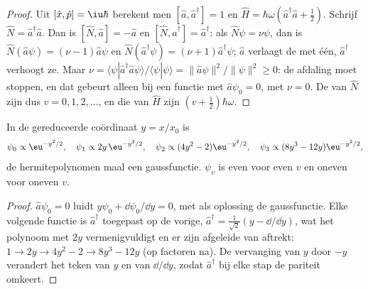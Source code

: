 \begin{proof}
Uit $[\hat x,\hat p] = \iu\hbar$ berekent men $[\hat a,\hat a^\dagger] = 1$ en
$\hat H = \hbar\omega(\hat a^\dagger\hat a + \frac12)$. Schrijf $\hat N =
\hat a^\dagger\hat a$. Dan is $[\hat N,\hat a] = -\hat a$ en $[\hat N,\hat
a^\dagger] = \hat a^\dagger$: als $\hat N\psi = \nu\psi$, dan is $\hat N(\hat
a\psi) = (\nu - 1)\hat a\psi$ en $\hat N(\hat a^\dagger\psi) = (\nu + 1)\hat
a^\dagger\psi$; $\hat a$ verlaagt de  met één, $\hat a^\dagger$
verhoogt ze. Maar $\nu = \langle\psi|\hat a^\dagger\hat a\psi\rangle/\langle\psi|\psi
\rangle = \|\hat a\psi\|^2/\|\psi\|^2 \ge 0$: de afdaling moet stoppen, en dat
gebeurt alleen bij een functie met $\hat a\psi_0 = 0$, met  $\nu = 0$.
De  van $\hat N$ zijn dus $v = 0, 1, 2, \dots$, en die van
$\hat H$ zijn $(v + \frac12)\hbar\omega$.
\end{proof}

\begin{proposition}\label{prop:b3:quantum-model-systems:oscillator-functions}
In de gereduceerde coördinaat $y = x/x_0$ is
\[
\psi_0 \propto \eu^{-y^2/2}, \quad \psi_1 \propto 2y\,\eu^{-y^2/2}, \quad
\psi_2 \propto (4y^2 - 2)\eu^{-y^2/2}, \quad \psi_3 \propto (8y^3 -
12y)\eu^{-y^2/2},
\]
de hermitepolynomen maal een gaussfunctie. $\psi_v$ is even voor even $v$
en oneven voor oneven $v$.
\end{proposition}

\begin{proof}
$\hat a\psi_0 = 0$ luidt $y\psi_0 + \dd\psi_0/\dd y = 0$, met als oplossing de
gaussfunctie. Elke volgende functie is $\hat a^\dagger$ toegepast op de
vorige,
$\hat a^\dagger = \frac{1}{\sqrt2}(y - \dd/\dd y)$, wat het polynoom met $2y$
vermenigvuldigt en er zijn afgeleide van aftrekt: $1 \to 2y \to 4y^2 - 2 \to
8y^3 - 12y$ (op factoren na). De vervanging van $y$ door $-y$ verandert het
teken van $y$
en van $\dd/\dd y$, zodat $\hat a^\dagger$ bij elke stap de pariteit omkeert.
\end{proof}

